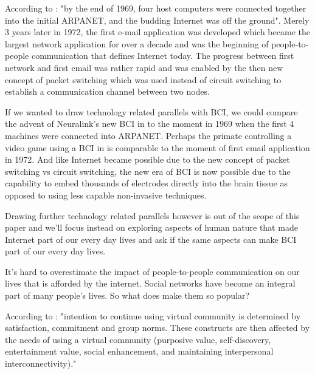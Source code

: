 \documentclass[fleqn,11pt]{olplainarticle}
\begin{document}
According to \cite{leiner2009brief}: "by the end of 1969, four host computers were
connected together into the initial ARPANET, and the budding Internet was off the ground". Merely 3 years later in 1972, the first e-mail application was developed which became the largest network application for over a decade and was the beginning of people-to-people communication that defines Internet today. The progress between first network and first email was rather rapid and was enabled by the then new concept of packet switching which was used instead of circuit switching to establish a communication channel between two nodes.

If we wanted to draw technology related parallels with BCI, we could compare the advent of Neuralink's new BCI in \cite{musk2019integrated} to the moment in 1969 when the first 4 machines were connected into ARPANET. Perhaps the primate controlling a video game using a BCI in \cite{wakefield_2020} is comparable to the moment of first email application in 1972. And like Internet became possible due to the new concept of packet switching vs circuit switching, the new era of BCI is now possible due to the capability to embed thousands of electrodes directly into the brain tissue as opposed to using less capable non-invasive techniques.

Drawing further technology related parallels however is out of the scope of this paper and we'll focus instead on exploring aspects of human nature that made Internet part of our every day lives and ask if the same aspects can make BCI part of our every day lives.

It's hard to overestimate the impact of people-to-people communication on our lives that is afforded by the internet. Social networks have become an integral part of many people's lives. So what does make them so popular?

According to \cite{cheung2009understanding}: "intention to continue using virtual community is determined by satisfaction, commitment and group norms. These constructs are then affected by the needs of using a virtual community (purposive value, self-discovery, entertainment value, social enhancement, and maintaining interpersonal interconnectivity)."
\end{document}
